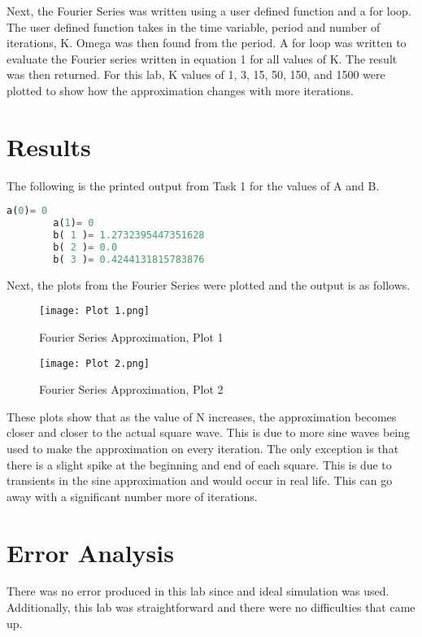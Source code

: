 \documentclass[12pt, titlepage]{article}
\begin{document}
   Next, the Fourier Series was written using a user defined function and a for loop.  The user defined function takes in the time variable, period and number of iterations, K.  Omega was then found from the period.  A for loop was written to evaluate the Fourier series written in equation 1 for all values of K.  The result was then returned.  For this lab, K values of 1, 3, 15, 50, 150, and 1500 were plotted to show how the approximation changes with more iterations.
    
    \section{Results}
    The following is the printed output from Task 1 for the values of A and B.
    
     \begin{lstlisting}[language=Python]  
        a(0)= 0
        a(1)= 0
        b( 1 )= 1.2732395447351628
        b( 2 )= 0.0
        b( 3 )= 0.4244131815783876
        \end{lstlisting}
        
    Next, the plots from the Fourier Series were plotted and the output is as follows.
    
    \begin{figure}[h!]
        \centering
        \texttt{[image: Plot 1.png]}
        \caption{Fourier Series Approximation, Plot 1}
        \label{fig:my_label}
    \end{figure}
    
    \begin{figure}[h!]
        \centering
        \texttt{[image: Plot 2.png]}
        \caption{Fourier Series Approximation, Plot 2}
        \label{fig:my_label}
    \end{figure}
    
    These plots show that as the value of N increases, the approximation becomes closer and closer to the actual square wave.  This is due to more sine waves being used to make the approximation on every iteration.  The only exception is that there is a slight spike at the beginning and end of each square.  This is due to transients in the sine approximation and would occur in real life.  This can go away with a significant number more of iterations.
    
   \clearpage
    \section{Error Analysis}
    There was no error produced in this lab since and ideal simulation was used.  Additionally, this lab was straightforward and there were no difficulties that came up.
    
\end{document}
